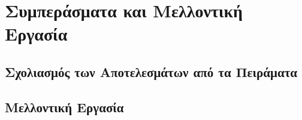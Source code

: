 \chapter{Συμπεράσματα και Μελλοντική Εργασία}
\label{ch:future_work}
\section{Σχολιασμός των Αποτελεσμάτων από τα Πειράματα}

\section{Μελλοντική Εργασία}